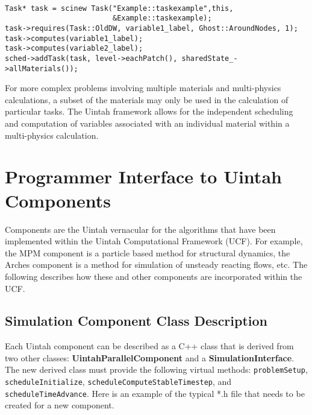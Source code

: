 \begin{Verbatim}[fontsize=\footnotesize]

Task* task = scinew Task("Example::taskexample",this,
                         &Example::taskexample);
task->requires(Task::OldDW, variable1_label, Ghost::AroundNodes, 1);
task->computes(variable1_label);
task->computes(variable2_label);
sched->addTask(task, level->eachPatch(), sharedState_->allMaterials());

\end{Verbatim}

For more complex problems involving multiple materials and
multi-physics calculations, a subset of the materials may only be used
in the calculation of particular tasks.  The Uintah framework allows
for the independent scheduling and computation of variables associated
with an individual material within a multi-physics calculation.

\section{Programmer Interface to Uintah Components}

Components are the Uintah vernacular for the algorithms that have
been implemented within the Uintah Computational Framework (UCF).
For example, the MPM component is a particle based method for structural
dynamics, the Arches component is a method for simulation of unsteady reacting
flows, etc.  The following describes how these and other components are
incorporated within the UCF.

\subsection{Simulation Component Class Description}

Each Uintah component can be described as a C++ class that is derived
from two other classes: \textbf{UintahParallelComponent} and a
\textbf{SimulationInterface}. The new derived class must provide the
following virtual methods: \texttt{problemSetup},
\texttt{scheduleInitialize}, \texttt{scheduleComputeStableTimestep},
and \texttt{scheduleTimeAdvance}.  Here is an example of the typical
*.h file that needs to be created for a new component.

